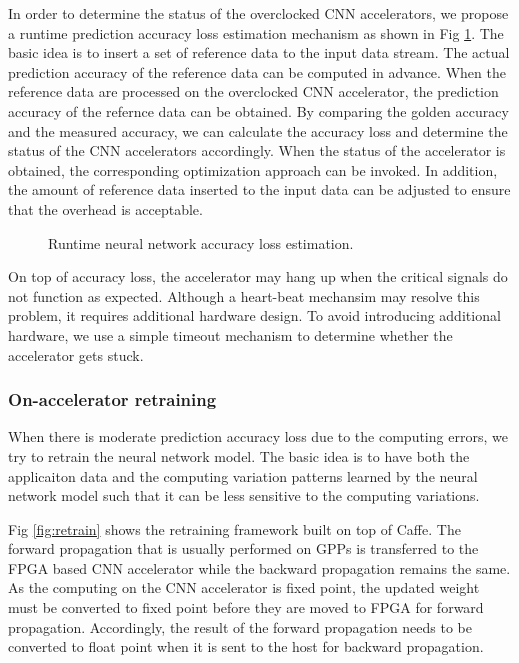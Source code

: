 In order to determine the status of the overclocked CNN accelerators, 
we propose a runtime prediction accuracy loss estimation mechanism 
as shown in Fig \ref{fig:loss_checkpoint}. The basic idea is to insert a set 
of reference data to the input data stream. The actual prediction 
accuracy of the reference data can be computed in advance. When the 
reference data are processed on the overclocked CNN accelerator, the 
prediction accuracy of the refernce data can be obtained. By comparing the 
golden accuracy and the measured accuracy, we can calculate the accuracy loss and 
determine the status of the CNN accelerators accordingly. When the status of 
the accelerator is obtained, the corresponding optimization approach 
can be invoked. In addition, the amount of reference data inserted to 
the input data can be adjusted to ensure that the overhead is acceptable.

\begin{figure}
    \caption{Runtime neural network accuracy loss estimation.}
\label{fig:loss_checkpoint}
\vspace{-1em}
\end{figure}

On top of accuracy loss, the accelerator may hang up when the critical signals 
do not function as expected. Although a heart-beat mechansim may resolve this problem, 
it requires additional hardware design. To avoid introducing additional hardware, 
we use a simple timeout mechanism to determine whether the accelerator gets stuck. 

\subsubsection{On-accelerator retraining}
When there is moderate prediction accuracy loss due to the computing errors, 
we try to retrain the neural network model. The basic idea is to have both the 
applicaiton data and the computing variation patterns learned by the neural 
network model such that it can be less sensitive to the computing variations. 

Fig \ref{fig:retrain} shows the retraining framework built on top of Caffe.
The forward propagation that is usually performed on GPPs is transferred to 
the FPGA based CNN accelerator while the backward propagation remains the 
same. As the computing on the CNN accelerator is fixed point, the updated 
weight must be converted to fixed point before they are moved to FPGA 
for forward propagation. Accordingly, the result of the forward propagation 
needs to be converted to float point when it is sent to the host for backward 
propagation.

